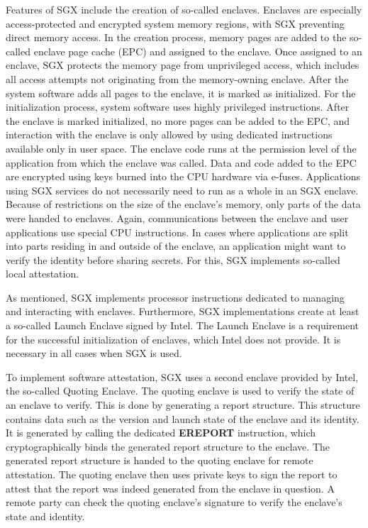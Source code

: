 Features of SGX include the creation of so-called enclaves. Enclaves are especially access-protected and encrypted
system memory regions, with SGX preventing direct memory access. In the creation process, memory pages are
added to the so-called enclave page cache (EPC) and assigned to the enclave. Once assigned to an enclave, SGX protects
the memory page from unprivileged access, which includes all access attempts not originating from the memory-owning
enclave. After the system software adds all pages to the enclave, it is marked as initialized. For the initialization
process, system software uses highly privileged instructions. After the enclave is marked initialized, no more pages
can be added to the EPC, and interaction with the
enclave is only allowed by using dedicated instructions available only in user space. The enclave code runs at the
permission level of the application from which the enclave was called. Data and code added to the EPC are encrypted
using keys burned into the CPU hardware via e-fuses. Applications using SGX services do not necessarily need to run as a
whole in an SGX enclave. Because of restrictions on the size of the enclave's memory, only parts of the data were handed
to enclaves. Again, communications between the enclave and user applications use special CPU instructions. In cases where
applications are split into parts residing in and outside of the enclave, an application might want to verify the identity
before sharing secrets. For this, SGX implements so-called local attestation.

As mentioned, SGX implements processor instructions dedicated to managing and interacting with enclaves. Furthermore,
SGX implementations create at least a so-called Launch Enclave signed by Intel. The Launch Enclave is a
requirement for the successful initialization of enclaves, which Intel does not provide. It is necessary in all cases when SGX
is used.

To implement software attestation, SGX uses a second enclave provided by Intel, the so-called Quoting Enclave. The
quoting enclave is used to verify the state of an enclave to verify. This is done by generating a report structure. This
structure contains data such as the version and launch state of the enclave and its identity. It is generated by calling
the dedicated \textbf{EREPORT} instruction, which cryptographically binds the generated report structure to the enclave.
The generated report structure is handed to the quoting enclave for remote attestation. The quoting enclave then uses
private keys to sign the report to attest that the report was indeed generated from the enclave in question. A remote
party can check the quoting enclave's signature to verify the enclave's state and identity.

